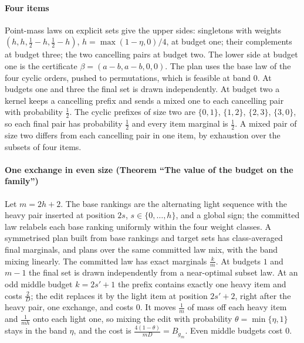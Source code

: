 \paragraph{Four items} Point-mass laws on explicit sets give the upper sides: singletons with
weights $(h,h,\frac12-h,\frac12-h)$, $h=\max(1-\eta,0)/4$, at budget one; their complements at
budget three; the two cancelling pairs at budget two. The lower side at budget one is the
certificate $\beta=(a-b,a-b,0,0)$. The plan uses the base law of the four cyclic orders, pushed
to permutations, which is feasible at band $0$. At budgets one and three the final set is drawn
independently. At budget two a kernel keeps a cancelling prefix and sends a mixed one to each
cancelling pair with probability $\frac12$. The cyclic prefixes of size two are $\{0,1\}$,
$\{1,2\}$, $\{2,3\}$, $\{3,0\}$, so each final pair has probability $\frac12$ and every item
marginal is $\frac12$. A mixed pair of size two differs from each cancelling pair in one item, by
exhaustion over the subsets of four items.

\paragraph{One exchange in even size (Theorem ``The value of the budget on the family'')} Let
$m=2h+2$. The base rankings are the alternating light sequence with the heavy pair inserted at
position $2s$, $s\in\{0,\dots,h\}$, and a global sign; the committed law relabels each base ranking
uniformly within the four weight classes. A symmetrised plan built from base rankings and target
sets has class-averaged final marginals, and plans over the same committed law mix, with the band
mixing linearly. The committed law has exact marginals $\frac km$. At budgets $1$ and $m-1$ the
final set is drawn independently from a near-optimal subset law. At an odd middle budget
$k=2s'+1$ the prefix contains exactly one heavy item and costs $\frac2D$; the edit replaces it by
the light item at position $2s'+2$, right after the heavy pair, one exchange, and costs $0$. It moves $\frac1m$ of mass off
each heavy item and $\frac1{mh}$ onto each light one, so mixing the edit with probability
$\theta=\min\{\eta,1\}$ stays in the band $\eta$, and the cost is $\frac{4(1-\theta)}{mD}=B_{g_m}$. Even
middle budgets cost $0$.

